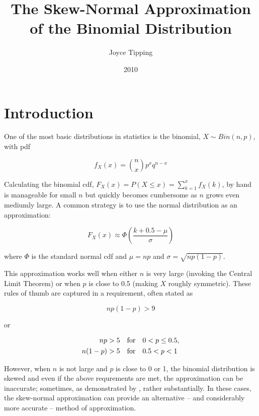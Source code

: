 \documentclass{article}
\begin{document}
\title{The Skew-Normal Approximation of the Binomial Distribution}
\author{Joyce Tipping}
\date{2010}
\maketitle

\section{Introduction}

One of the most basic distributions in statistics is the binomial, $X \sim
Bin(n,p)$, with pdf

\begin{equation*}
  f_X(x) = \binom{n}{x} p^x q^{n-x}
\end{equation*}

Calculating the binomial cdf, $F_X(x) = P(X \leq x) = \sum_{k=1}^x f_X(k)$, by
hand is manageable for small $n$ but quickly becomes cumbersome as $n$ grows
even mediumly large. A common strategy is to use the normal distribution as an
approximation:

\begin{equation}
  F_X(x) \approx \Phi \left( \frac{k + 0.5 - \mu}{\sigma} \right)
\end{equation}

where $\Phi$ is the standard normal cdf and $\mu = np$ and $\sigma =
\sqrt{np(1-p)}$.

This approximation works well when either $n$ is very large (invoking the
Central Limit Theorem) or when $p$ is close to 0.5 (making $X$ roughly
symmetric). These rules of thumb are captured in a requirement, often stated as

\begin{equation*}
  np(1-p) > 9
\end{equation*}

or

\begin{align*}
      np &> 5 \quad \textnormal{for} \quad  0 < p \leq 0.5, \\
  n(1-p) &> 5 \quad \textnormal{for} \quad  0.5 < p < 1
\end{align*}

However, when $n$ is not large and $p$ is close to 0 or 1, the binomial
distribution is skewed and even if the above requrements are met, the
approximation can be inaccurate; sometimes, as demonstrated by \citet{mabs},
rather substantially. In these cases, the skew-normal approximation can provide
an alternative -- and considerably more accurate -- method of approximation.
\end{document}
